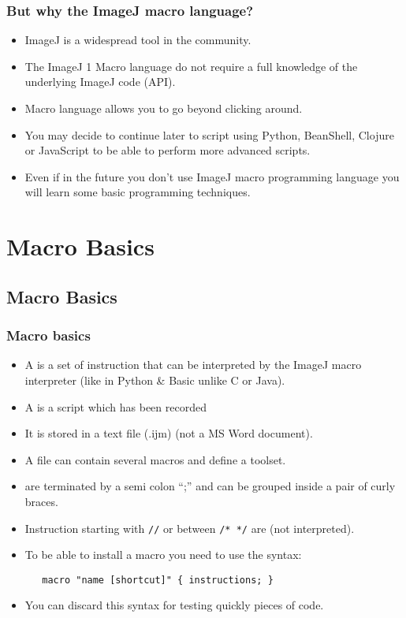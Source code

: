 \begin{frame}
  \frametitle{But why the ImageJ macro language?}
  \begin{itemize}
    \item ImageJ is a widespread tool in the community.
    \item The ImageJ 1 Macro language do not require a full knowledge of the
    underlying ImageJ code (API).
    \item Macro language allows you to go beyond clicking around.
    \item You may decide to continue later to script using Python,
    BeanShell, Clojure or JavaScript to be able to perform more
    advanced scripts.
    \item Even if in the future you don't use ImageJ macro programming
    language you will learn some basic programming techniques.
  \end{itemize}
\end{frame}

\section{Macro Basics}
\subsection{Macro Basics}
\begin{frame}[fragile]
  \frametitle<presentation>{Macro basics}
  \begin{itemize}
    \item A  is a set of instruction that can be interpreted
    by the ImageJ macro interpreter (like in Python \& Basic unlike
    C or Java).
    \item A  is a script which has been recorded
    \item It is stored in a text file (.ijm) (not a MS Word document).
    \item A file can contain several macros and define a toolset.
    \item {} are terminated by a semi colon ``;'' and can
      be grouped inside a pair of curly braces.
    \item Instruction starting with \verb$//$ or between \verb$/* */$
      are  (not interpreted).
    \item To be able to install a macro you need to use the syntax:
      \begin{minipage}{5cm}
        \verb$   macro "name [shortcut]" { instructions; } $
      \end{minipage}
    \item You can discard this syntax for testing quickly pieces of code.
\end{itemize}
\end{frame}

